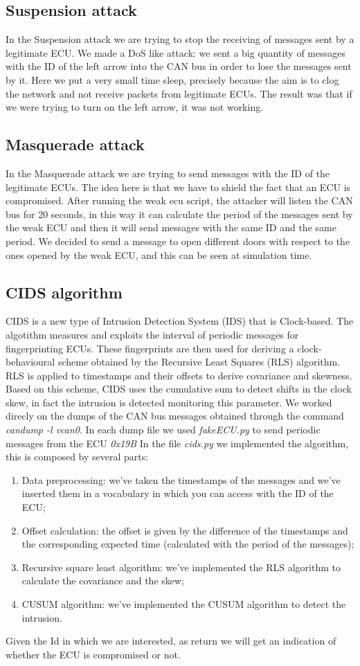 \documentclass[12pt]{article}
\begin{document}
\subsection{Suspension attack}
In the Suspension attack we are trying to stop the receiving of messages sent by a legitimate ECU. We made 
a DoS like attack: we sent a big quantity of messages with the ID of the left arrow into the CAN bus in order 
to lose the messages sent by it. Here we put a very small time sleep, precisely because the aim is to clog 
the network and not receive packets from legitimate ECUs. The result was that if we were trying to turn on 
the left arrow, it was not working.
\subsection{Masquerade attack}
In the Masquerade attack we are trying to send messages with the ID of the legitimate ECUs. The idea here 
is that we have to shield the fact that an ECU is compromised. After running the weak ecu script, the 
attacker will listen the CAN bus for 20 seconds, in this way it can calculate the period of the messages 
sent by the weak ECU and then it will send messages with the same ID and the same period. We decided to 
send a message to open different doors with respect to the ones opened by the weak ECU, and this can be 
seen at simulation time.
\subsection{CIDS algorithm}
CIDS is a new type of Intrusion Detection System (IDS) that is Clock-based. The algotithm measures and 
exploits the interval of periodic messages for fingerprinting ECUs. These fingerprints are then used for 
deriving a clock-behavioural scheme obtained by the Recursive Least Squares (RLS) algorithm. RLS is 
applied to timestamps and their offsets to derive covariance and skewness. Based on this scheme, 
CIDS uses the cumulative sum to detect shifts in the clock skew, in fact the intrusion is detected 
monitoring this parameter. We worked direcly on the dumps of the CAN bus messages obtained through 
the command \textit{candump -l vcan0}. In each dump file we used \textit{fakeECU.py} to send periodic 
messages from the ECU \textit{0x19B}
In the file \textit{cids.py} we implemented the algorithm, this is composed by several 
parts:
\begin{enumerate}
    \item Data preprocessing: we've taken the timestamps of the messages and we've inserted them 
    in a vocabulary in which you can access with the ID of the ECU;
    \item Offset calculation: the offset is given by the difference of the timestamps and the corresponding
    expected time (calculated with the period of the messages);
    \item Recursive square least algorithm: we've implemented the RLS algorithm to calculate the covariance 
    and the skew;
    \item CUSUM algorithm: we've implemented the CUSUM algorithm to detect the intrusion. 
\end{enumerate}
Given the Id in which we are interested, as return we will get an indication of whether the ECU is
compromised or not.
\end{document}
